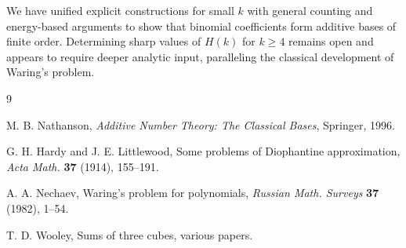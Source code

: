 \documentclass[11pt]{amsart}
\begin{document}
We have unified explicit constructions for small $k$ with general counting
and energy-based arguments to show that binomial coefficients form additive
bases of finite order. Determining sharp values of $H(k)$ for $k \ge 4$
remains open and appears to require deeper analytic input, paralleling the
classical development of Waring's problem.

\begin{thebibliography}{9}

M. B. Nathanson,
\emph{Additive Number Theory: The Classical Bases},
Springer, 1996.

G. H. Hardy and J. E. Littlewood,
Some problems of Diophantine approximation,
\emph{Acta Math.} \textbf{37} (1914), 155--191.

A. A. Nechaev,
Waring's problem for polynomials,
\emph{Russian Math. Surveys} \textbf{37} (1982), 1--54.

T. D. Wooley,
Sums of three cubes,
various papers.

\end{thebibliography}
\end{document}
